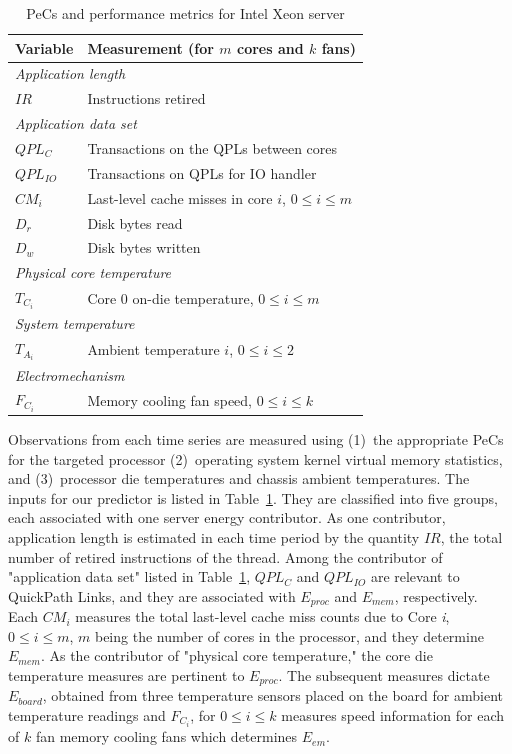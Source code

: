 \documentclass[times, 10pt,twocolumn]{IEEEtran}
\begin{document}
\begin{small}
\begin{table}[tbhp]
  \centering
  \caption{PeCs and performance metrics for Intel Xeon server}
  \label{tab:intelmodel}
  \begin{tabular}{l l}
\hline
\hline
\textbf{Variable}&\textbf{Measurement} (for $m$ cores and $k$ fans)\\
\hline
\hline
\multicolumn{2}{l}{\textit{Application length}}\\
$IR$&Instructions retired \\
\hline
\multicolumn{2}{l}{\textit{Application data set}}\\
$QPL_{C}$&Transactions on the QPLs between cores\\
$QPL_{IO}$&Transactions on QPLs for IO handler\\
$CM_{i}$&Last-level cache misses in core $i$, $0\leq i \leq m$\\
$D_{r}$&Disk bytes read\\
$D_{w}$&Disk bytes written\\
\hline
\multicolumn{2}{l}{\textit{Physical core temperature}}\\
$T_{C_{i}}$&Core 0 on-die temperature, $0\leq i \leq m$\\
\hline
\multicolumn{2}{l}{\textit{System temperature}}\\
$T_{A_{i}}$&Ambient temperature $i$, $0\leq i \leq 2$\\
\hline
\multicolumn{2}{l}{\textit{Electromechanism}}\\
$F_{C_{i}}$&Memory cooling fan speed, $0 \leq i \leq k$\\
\hline
  \end{tabular}
\end{table}
\end{small}

Observations from each time series are measured using (1)~the
appropriate PeCs for the targeted processor (2)~operating system kernel
virtual memory statistics, and (3)~processor die temperatures and
chassis ambient temperatures.  The inputs for our predictor is listed in
Table~\ref{tab:intelmodel}.  They are classified into five groups, each
associated with one server energy contributor.  As one contributor,
application length is estimated in each time period by the quantity
$IR$, the total number of retired instructions of the thread.  Among the
contributor of "application data set" listed in
Table~\ref{tab:intelmodel}, $QPL_{C}$ and $QPL_{IO}$ are relevant to
QuickPath Links, and they are associated with $E_{proc}$ and $E_{mem}$,
respectively.  Each $CM_{i}$ measures the total last-level cache miss
counts due to Core \textit{i}, $0 \leq i \leq m$, $m$ being the number
of cores in the processor, and they determine $E_{mem}$.  As the
contributor of "physical core temperature," the core die temperature
measures are pertinent to $E_{proc}$.  The subsequent measures dictate
$E_{board}$, obtained from three temperature sensors placed on the board for
ambient temperature readings and $F_{C_{i}}$, for $0\leq i \leq k$ measures speed
information for each of $k$ fan memory cooling fans which determines $E_{em}$.
\end{document}

